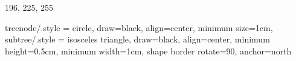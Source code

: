 \definecolor{mydarkblue}{RGB} {196, 225, 255}
\newcommand{\dfclt}[1]{
	\colorbox{mydeepteal}{
		\newcount\dfcpt
		\dfcpt=0
		\loop
		\advance\dfcpt by 1
		\textcolor{white}{$\bigstar$}
		\ifnum\dfcpt<#1
		\repeat
	}
}


\usepackage{tikz}
\usepackage{pgfplots}

\pgfplotsset{compat=newest}
\usetikzlibrary{shapes.geometric,arrows,fit,matrix,positioning}
\tikzset
{
	treenode/.style = {circle, draw=black, align=center, minimum size=1cm},
	subtree/.style  = {isosceles triangle, draw=black, align=center, minimum height=0.5cm, minimum width=1cm, shape border rotate=90, anchor=north}
}

\makeindex             %

\usepackage{longtable}
\usepackage{calligra}
\usepackage{lipsum}


\makeatletter
\renewcommand{\@seccntformat}[1]{\textcolor{orange}{\csname the#1\endcsname}\hspace{1em}}                    

\renewcommand{\section}{\@startsection{section}{1}{\z@}
	{-4ex \@plus -1ex \@minus -.4ex}
	{1.5ex \@plus.2ex}
	{\normalfont\Large\sffamily\bfseries\color{orange}}}

\renewcommand{\subsection}{\@startsection{subsection}{2}{\z@}
	{-3.5ex \@plus -1ex \@minus -.2ex}
	{1ex \@plus.2ex}
	{\normalfont\large\sffamily\bfseries\color{mydeepteal}}}

\renewcommand{\subsubsection}{\@startsection{subsubsection}{3}{\z@}
	{-2ex \@plus -0.1ex \@minus -.2ex}
	{0.5ex}
	{\normalfont\normalsize\sffamily\bfseries\color{black}}}

\renewcommand{\paragraph}{\@startsection{paragraph}{4}{\z@}
	{-2ex \@plus-.2ex \@minus .2ex}
	{.1ex}
	{\normalfont\small\sffamily\bfseries}}
\makeatother
